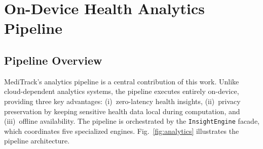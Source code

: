 \documentclass[journal,onecolumn,web]{ieeecolor}
\begin{document}
\section{On-Device Health Analytics Pipeline}
\label{sec:analytics}

\subsection{Pipeline Overview}
MediTrack's analytics pipeline is a central
contribution of this work. Unlike cloud-dependent
analytics systems, the pipeline executes entirely
on-device, providing three key advantages:
(i)~zero-latency health insights, (ii)~privacy
preservation by keeping sensitive health data local
during computation, and (iii)~offline availability.
The pipeline is orchestrated by the
{\tt InsightEngine} facade, which coordinates five
specialized engines. Fig.~\ref{fig:analytics}
illustrates the pipeline architecture.
\end{document}

